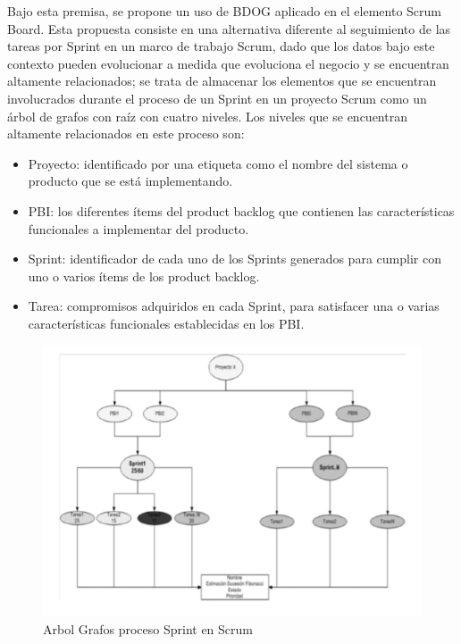 \documentclass[preprint,12pt]{elsarticle}
\begin{document}
Bajo esta premisa, se propone un uso de BDOG aplicado en el elemento Scrum Board. Esta
propuesta consiste en una alternativa diferente al seguimiento de las tareas por Sprint en un marco de trabajo Scrum, dado que los datos bajo este contexto pueden evolucionar a medida que evoluciona el negocio y se encuentran altamente relacionados; se trata de almacenar los elementos que se encuentran involucrados durante el proceso de un Sprint en un proyecto Scrum como un árbol de grafos con raíz con cuatro niveles. Los niveles que se encuentran altamente relacionados en este proceso son:
\begin{itemize}
\item Proyecto: identificado por una etiqueta como
el nombre del sistema o producto que se está
implementando.
\item PBI: los diferentes ítems del product backlog
que contienen las características funcionales a
implementar del producto.
\item Sprint: identificador de cada uno de los Sprints
generados para cumplir con uno o varios ítems de
los product backlog.
\item Tarea: compromisos adquiridos en cada Sprint,
para satisfacer una o varias características
funcionales establecidas en los PBI.
\end{itemize}

\begin{figure}[htb]
	\begin{center}
		\includegraphics[width=14cm]{./IMAGENES/basededatos_4} 
		\caption{Arbol Grafos proceso Sprint en Scrum}
	\end{center}
\end{figure}
\end{document}
